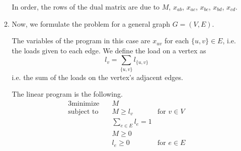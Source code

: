 \documentclass[letterpaper,11pt]{article}
\begin{document}
\begin{enumerate}
\begin{enumerate}
                In order, the rows of the dual matrix are due to $M$, $x_{ab}$,
                $x_{ac}$, $x_{bc}$, $x_{bd}$, $x_{cd}$.

            \item Now, we formulate the problem for a general graph
                $G = (V, E)$.

                The variables of the program in this case are $x_{uv}$
                for each $\{u, v\} \in E$, i.e. the loads given to each edge.
                We define the load on a vertex as
                $$
                l_v = \sum_{\{u, v\}} {l_{\{u, v\}}}
                $$
                i.e. the sum of the loads on the vertex's adjacent edges.

                The linear program is the following.
                \begin{alignat*}{3}
                    \text{minimize} \quad
                        & M \\
                    \text{subject to} \quad
                        & M \geq l_v & \text{for } v \in V \\
                        & \sum_{e \in E} l_e = 1 \\
                        & M \geq 0 \\
                        & l_e \geq 0 & \text{for } e \in E
                \end{alignat*}
        \end{enumerate}

\end{enumerate}
\end{document}
